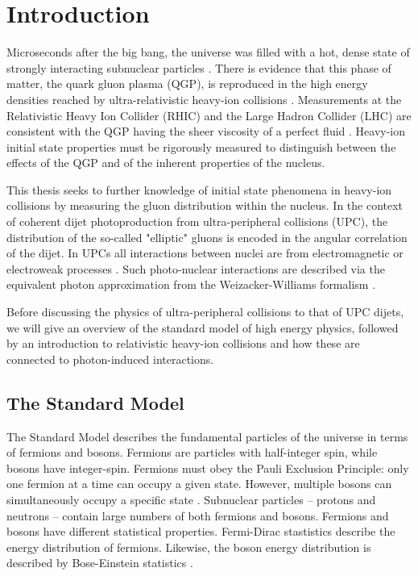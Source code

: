 \setlength\abovedisplayskip{0.4pt}
\setlength\belowdisplayskip{0.4pt}

\chapter{Introduction}

Microseconds after the big bang, the universe was filled with a hot, dense state of strongly interacting subnuclear particles \cite{Rafelski:2013obw}. There is evidence that this phase of matter, the quark gluon plasma (QGP), is reproduced in the high energy densities reached by ultra-relativistic heavy-ion collisions \cite{Arsene:2004fa}. Measurements at the Relativistic Heavy Ion Collider (RHIC) and the Large Hadron Collider (LHC) are consistent with the QGP having the sheer viscosity of a perfect fluid \cite{Long:796947}. Heavy-ion initial state properties must be rigorously measured to distinguish between the effects of the QGP and of the inherent properties of the nucleus.

This thesis seeks to further knowledge of initial state phenomena in heavy-ion collisions by measuring the gluon distribution within the nucleus. In the context of coherent dijet photoproduction from ultra-peripheral collisions (UPC), the distribution of the so-called "elliptic" gluons is encoded in the angular correlation of the dijet\cite{Hagiwara:2016kam}. In UPCs all interactions between nuclei are from electromagnetic or electroweak processes \cite{Contreras:2015dqa}. Such photo-nuclear interactions are described via the equivalent photon approximation from the Weizacker-Williams formalism \cite{vonWeizsacker:1934sx}\cite{Williams:1934ad}. 

Before discussing the physics of ultra-peripheral collisions to that of UPC dijets, we will give an overview of the standard model of high energy physics, followed by an introduction to relativistic heavy-ion collisions and how these are connected to photon-induced interactions. 

\section{The Standard Model}

The Standard Model describes the fundamental particles of the universe in terms of fermions and bosons. Fermions are particles with half-integer spin, while bosons have integer-spin. Fermions must obey the Pauli Exclusion Principle: only one fermion at a time can occupy a given state. However, multiple bosons can simultaneously occupy a specific state \cite{Dyson:1967:SM}. Subnuclear particles -- protons and neutrons -- contain large numbers of both fermions and bosons. Fermions and bosons have different statistical properties. Fermi-Dirac stastistics describe the energy distribution of fermions. Likewise, the boson energy distribution is described by Bose-Einstein statistics \cite{Huang_1987}. 

